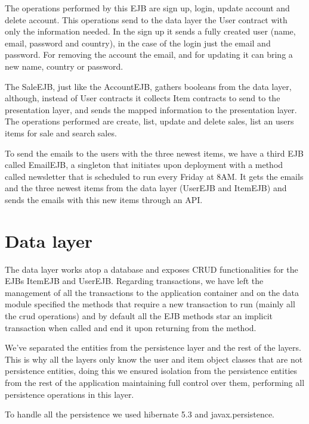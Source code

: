 \documentclass{article}
\begin{document}
\qquad The operations performed by this \ac{EJB} are sign up, login, update account and delete account. This operations send to the data layer the User contract with only the information needed. In the sign up it sends a fully created user (name, email, password and country), in the case of the login just the email and password. For removing the account the email, and for updating it can bring a new name, country or password.

\qquad The SaleEJB, just like the AccountEJB, gathers booleans from the data layer, although, instead of User contracts it collects Item contracts to send to the presentation layer, and sends the mapped information to the presentation layer. The operations performed are create, list, update and delete sales, list an users items for sale and search sales. 

\qquad To send the emails to the users with the three newest items, we have a third \ac{EJB} called EmailEJB, a singleton that initiates upon deployment with a method called newsletter that is scheduled to run every Friday at 8AM. It gets the emails and the three newest items from the data layer (UserEJB and ItemEJB) and sends the emails with this new items through an API. 




\section{Data layer}

\qquad The data layer works atop a database and exposes CRUD functionalities for the \ac{EJB}s ItemEJB and UserEJB. Regarding transactions, we have left the management of all the transactions to the application container and on the data module specified the methods that require a new transaction to run  (mainly all the crud operations) and by default all the \ac{EJB} methods star an implicit transaction when called and end it upon returning from the method.

\qquad We've separated the entities from the persistence layer and the rest of the layers. This is why all the layers only know the user and item object classes that are not persistence entities, doing this we ensured isolation from the persistence entities from the rest of the application maintaining full control over them, performing all persistence operations in this layer.

\qquad To handle all the persistence we used hibernate 5.3 and javax.persistence. 
\end{document}
